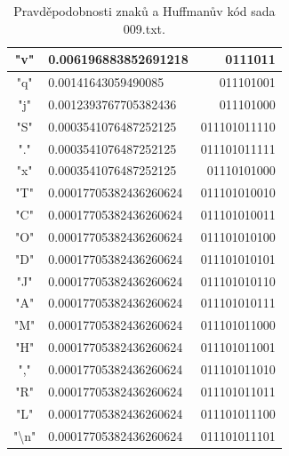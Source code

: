 \documentclass[12pt]{article}
\begin{document}
\begin{table}[!ht]
\begin{tabular}{ | c | l | r | }
"v"     &       0.006196883852691218    &       0111011 \\ \hline
"q"     &       0.00141643059490085     &       011101001       \\ \hline
"j"     &       0.0012393767705382436   &       011101000       \\ \hline
"S"     &       0.0003541076487252125   &       011101011110    \\ \hline
"."     &       0.0003541076487252125   &       011101011111    \\ \hline
"x"     &       0.0003541076487252125   &       01110101000     \\ \hline
"T"     &       0.00017705382436260624  &       011101010010    \\ \hline
"C"     &       0.00017705382436260624  &       011101010011    \\ \hline
"O"     &       0.00017705382436260624  &       011101010100    \\ \hline
"D"     &       0.00017705382436260624  &       011101010101    \\ \hline
"J"     &       0.00017705382436260624  &       011101010110    \\ \hline
"A"     &       0.00017705382436260624  &       011101010111    \\ \hline
"M"     &       0.00017705382436260624  &       011101011000    \\ \hline
"H"     &       0.00017705382436260624  &       011101011001    \\ \hline
","     &       0.00017705382436260624  &       011101011010    \\ \hline
"R"     &       0.00017705382436260624  &       011101011011    \\ \hline
"L"     &       0.00017705382436260624  &       011101011100    \\ \hline
"\textbackslash n"      &       0.00017705382436260624  &       011101011101    \\ \hline
\end{tabular}
\caption{Pravděpodobnosti znaků a Huffmanův kód sada 009.txt.}
\label{pzhk_009.txt_table}
\end{table}
   		
\end{document}
